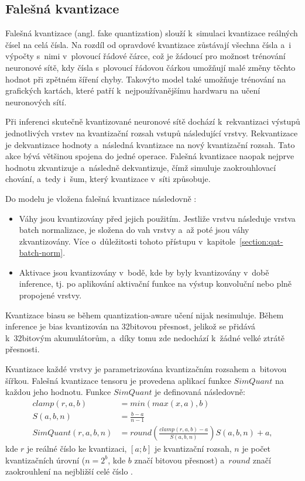 \subsection{Falešná kvantizace}
\label{section:fake_quant}
Falešná kvantizace (angl. fake quantization) slouží k~simulaci kvantizace reálných čísel na celá čísla. Na rozdíl od opravdové kvantizace zůstávají všechna čísla a~i výpočty s~nimi v~plovoucí řádové čárce, což je žádoucí pro možnost trénování neuronové sítě, kdy čísla s~plovoucí řádovou čárkou umožňují malé změny těchto hodnot při zpětném šíření chyby. Takovýto model také umožňuje trénování na grafických kartách, které patří k~nejpoužívanějšímu hardwaru na učení neuronových sítí.

Při inferenci skutečně kvantizované neuronové sítě dochází k~rekvantizaci výstupů jednotlivých vrstev na kvantizační rozsah vstupů následující vrstvy. Rekvantizace je dekvantizace hodnoty a~následná kvantizace na nový kvantizační rozsah. Tato akce bývá většinou spojena do jedné operace. Falešná kvantizace naopak nejprve hodnotu zkvantizuje a~následně dekvantizuje, čímž simuluje zaokrouhlovací chování, a~tedy i~šum, který kvantizace v~síti způsobuje.

Do modelu je vložena falešná kvantizace následovně \cite{https://doi.org/10.48550/arxiv.1712.05877}:
\begin{itemize}
  \item Váhy jsou kvantizovány před jejich použitím. Jestliže vrstvu následuje vrstva batch normalizace, je složena do vah vrstvy a~až poté jsou váhy zkvantizovány. Více o~důležitosti tohoto přístupu v~kapitole~\ref{section:qat-batch-norm}.
  
  \item Aktivace jsou kvantizovány v~bodě, kde by byly kvantizovány v~době inference, tj. po aplikování aktivační funkce na výstup konvoluční nebo plně propojené vrstvy.
\end{itemize}

Kvantizace biasu se během quantization-aware učení nijak nesimuluje. Během inference je bias kvantizován na 32bitovou přesnost, jelikož se přidává k~32bitovým akumulátorům, a~díky tomu zde nedochází k~žádné velké ztrátě přesnosti. 

Kvantizace každé vrstvy je parametrizována kvantizačním rozsahem a~bitovou šířkou. Falešná kvantizace tensoru je provedena aplikací funkce $SimQuant$ na každou jeho hodnotu. Funkce $SimQuant$ je definovaná následovně:
\begin{align}
    clamp(r,a,b) &= min(max(x,a),b) \\
    S(a,b,n) &= \frac{b - a}{n - 1} \\
    SimQuant(r,a,b,n) &= round \left( \frac{clamp(r,a,b) - a}{S(a,b,n)} \right) S(a,b,n) + a, \label{eq:sim_quant}
\end{align}
kde $r$ je reálné číslo ke kvantizaci, $[a;b]$ je kvantizační rozsah, $n$ je počet kvantizačních úrovní ($n=2^{b}$, kde $b$ značí bitovou přesnost) a~$round$ značí zaokrouhlení na nejbližší celé číslo \cite{https://doi.org/10.48550/arxiv.1712.05877}.

